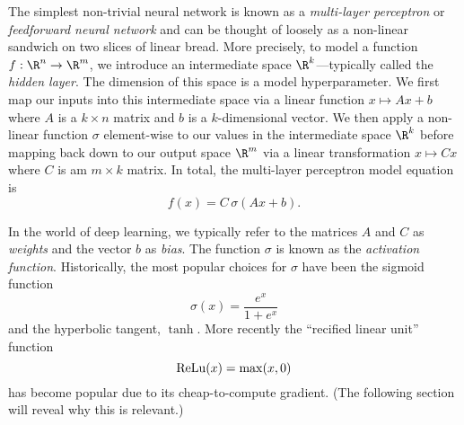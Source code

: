 The simplest non-trivial neural network is known as a \emph{multi-layer perceptron} or \emph{feedforward neural network} and can be thought of loosely as a non-linear sandwich on two slices of linear bread. More precisely, to model a function $f : \R^n \to \R^m$, we introduce an intermediate space $\R^k$---typically called the \emph{hidden layer}. The dimension of this space is a model hyperparameter. We first map our inputs into this intermediate space via a linear function $x \mapsto Ax + b$ where $A$ is a $k \times n$ matrix and $b$ is a $k$-dimensional vector. We then apply a non-linear function $\sigma$ element-wise to our values in the intermediate space $\R^k$ before mapping back down to our output space $\R^m$ via a linear transformation $x \mapsto Cx$ where $C$ is am $m \times k$ matrix. In total, the multi-layer perceptron model equation is
\begin{equation}
	\label{eqn:mlp}
	f(x) = C \, \sigma(Ax + b).
\end{equation}

In the world of deep learning, we typically refer to the matrices $A$ and $C$ as \emph{weights} and the vector $b$ as \emph{bias}. The function $\sigma$ is known as the \emph{activation function}. Historically, the most popular choices for $\sigma$ have been the sigmoid function
\begin{equation}
	\sigma(x) = \frac{e^x}{1 + e^x}
\end{equation}
and the hyperbolic tangent, $\tanh$. More recently the ``recified linear unit'' function
\begin{equation}
	{\rm ReLu}(x) = \max(x, 0)
\end{equation}
has become popular due to its cheap-to-compute gradient. (The following section will reveal why this is relevant.)

